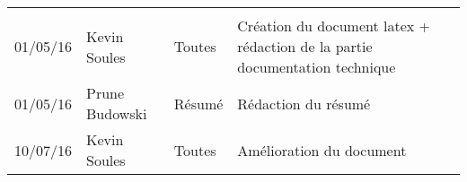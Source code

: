 \small
\begin{tabular}{|p{1.5cm}| >{\raggedright}p{2.9cm}| >{\raggedright}p{3.2cm}|p{7.2cm}|}
  \hline
  \rowcolor{Gainsboro} \color{Navy}{\bfseries Date}  & \color{Navy}{\bfseries Auteur} & \color{Navy}{\bfseries Section(s)}  &\color{Navy}{\bfseries Commentaires} \\
  01/05/16 & Kevin Soules & Toutes  & Création du document latex + rédaction de la partie documentation technique\\
  \hline
  01/05/16 & Prune Budowski & Résumé & Rédaction du résumé\\
  \hline
  10/07/16 & Kevin Soules & Toutes  & Amélioration du document\\
  \hline
\end{tabular}
\normalsize
